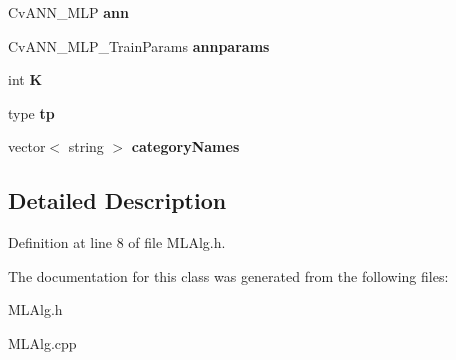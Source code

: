 \begin{DoxyCompactItemize}
\item 
\hypertarget{class_m_l_alg_adb1432782a067c9f8a1a8834d93642f5}{Cv\-A\-N\-N\-\_\-\-M\-L\-P {\bfseries ann}}\label{class_m_l_alg_adb1432782a067c9f8a1a8834d93642f5}

\item 
\hypertarget{class_m_l_alg_a92cf578aa93fd65a4ef521301b92839b}{Cv\-A\-N\-N\-\_\-\-M\-L\-P\-\_\-\-Train\-Params {\bfseries annparams}}\label{class_m_l_alg_a92cf578aa93fd65a4ef521301b92839b}

\item 
\hypertarget{class_m_l_alg_ab2be419780446f10b561fc5b2aaaeeda}{int {\bfseries K}}\label{class_m_l_alg_ab2be419780446f10b561fc5b2aaaeeda}

\item 
\hypertarget{class_m_l_alg_afc48fbeac702aeb6b9d32c99da80dc54}{type {\bfseries tp}}\label{class_m_l_alg_afc48fbeac702aeb6b9d32c99da80dc54}

\item 
\hypertarget{class_m_l_alg_a85ca41d5b92e86c8d9c6321adef7a5f9}{vector$<$ string $>$ {\bfseries category\-Names}}\label{class_m_l_alg_a85ca41d5b92e86c8d9c6321adef7a5f9}

\end{DoxyCompactItemize}


\subsection{Detailed Description}


Definition at line 8 of file M\-L\-Alg.\-h.



The documentation for this class was generated from the following files\-:\begin{DoxyCompactItemize}
\item 
M\-L\-Alg.\-h\item 
M\-L\-Alg.\-cpp\end{DoxyCompactItemize}
